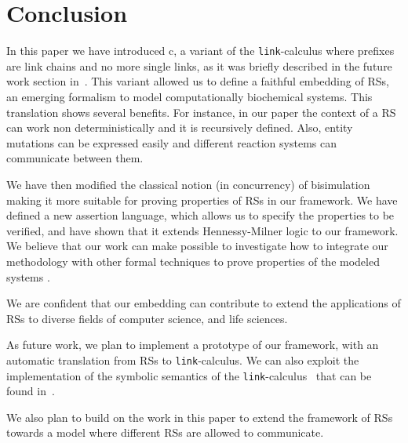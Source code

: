 
\section{Conclusion}\label{sec:conclusion}

In this paper we have introduced c\CNA, a variant of the {\tt link}-calculus
where prefixes are link chains and no more single links, as it was 
briefly described in the future work section in~\cite{BBB17}.
This variant allowed us to define 
a faithful embedding of 
RSs,
an emerging formalism to model computationally biochemical systems.
This translation shows several benefits.
For instance, in our paper the context of a RS can work non deterministically and it 
is recursively defined.
Also, entity mutations can be expressed easily and different reaction systems can
communicate between them.

We have then modified the classical notion (in concurrency) of bisimulation
making it more suitable for proving properties of 
RSs
in our
framework.
We have defined a new assertion language, which allows us to specify
the properties to be verified, and have shown that it extends Hennessy-Milner logic
to our framework.
We believe that our work can make 
possible to investigate how to integrate our methodology
with other formal techniques to prove 
properties of the modeled systems \cite{CFHOT15,OCHF16,BBGLBH2017}.

We are confident that our embedding can contribute to extend the applications
of 
RSs
to diverse fields of computer science, and life
sciences.

As future work, we plan to implement a prototype of our framework,
with an automatic translation from RSs to  {\tt link}-calculus. 
We can also exploit the implementation of  the symbolic semantics of 
the {\tt link}-calculus~\cite{BrodoO17} that can be found in~\cite{tool}.

We also plan to build on the work in this paper to extend the framework
of RSs towards a model where different RSs are allowed to communicate.

